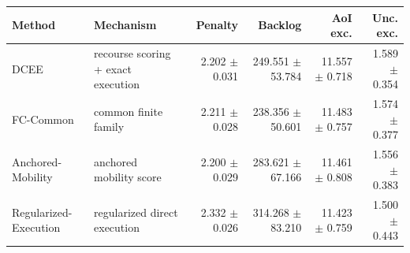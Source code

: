 \begin{tabular}{llrrrr}
\toprule
Method & Mechanism & Penalty & Backlog & AoI exc. & Unc. exc. \\
\midrule
DCEE & recourse scoring + exact execution & 2.202 $\pm$ 0.031 & 249.551 $\pm$ 53.784 & 11.557 $\pm$ 0.718 & 1.589 $\pm$ 0.354 \\
FC-Common & common finite family & 2.211 $\pm$ 0.028 & 238.356 $\pm$ 50.601 & 11.483 $\pm$ 0.757 & 1.574 $\pm$ 0.377 \\
Anchored-Mobility & anchored mobility score & 2.200 $\pm$ 0.029 & 283.621 $\pm$ 67.166 & 11.461 $\pm$ 0.808 & 1.556 $\pm$ 0.383 \\
Regularized-Execution & regularized direct execution & 2.332 $\pm$ 0.026 & 314.268 $\pm$ 83.210 & 11.423 $\pm$ 0.759 & 1.500 $\pm$ 0.443 \\
\bottomrule
\end{tabular}
